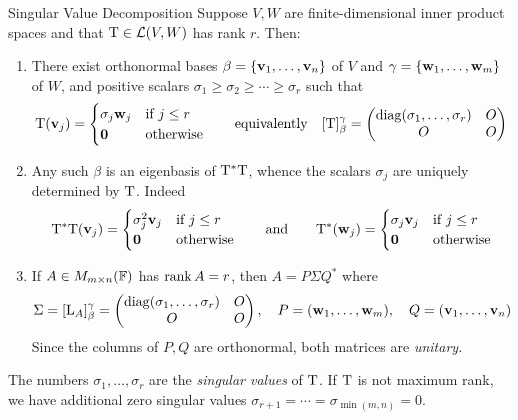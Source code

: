 \begin{thm}{Singular Value Decomposition}{}
	Suppose $V,W$ are finite-dimensional inner product spaces and that $\mathrm{T}\in\mathcal{L}(V,W)$ has rank $r$. Then:
	\begin{enumerate}
	  \item There exist orthonormal bases $\beta=\{{\mathbf{{\mathbf{v}}}}_1,\ldots,{\mathbf{{\mathbf{v}}}}_{n}\}$ of $V$ and $\gamma=\{{\mathbf{{\mathbf{w}}}}_1,\ldots,{\mathbf{{\mathbf{w}}}}_{m}\}$ of $W$, and positive scalars $\sigma_1\ge\sigma_2\ge\cdots\ge \sigma_r$ such that
		\[
			\mathrm{T}({\mathbf{v}}_j)=
			\begin{cases}
				\sigma_j{\mathbf{w}}_j&\text{if }j\le r\\
				\mathbf{0}&\text{otherwise}
			\end{cases}
			\qquad\text{equivalently}\quad 
			[\mathrm{T}]_\beta^\gamma=
			\begin{pmatrix}
				\operatorname{diag}(\sigma_1,\ldots,\sigma_r)&O\\
				O&O
			\end{pmatrix}
		\]
		\item Any such $\beta$ is an eigenbasis of $\mathrm{T}^*\mathrm{T}$, whence the scalars $\sigma_j$ are uniquely determined by $\mathrm{T}$. Indeed
	  \[
	  	\mathrm{T}^*\mathrm{T}({\mathbf{v}}_j)=
	  	\begin{cases}
	  		\sigma_j^2{\mathbf{v}}_j&\text{if }j\le r\\
	  		\mathbf{0}&\text{otherwise}
	  	\end{cases}
	  	\qquad\text{and}\qquad
	  	\mathrm{T}^*({\mathbf{w}}_j)=
	  	\begin{cases}
	  		\sigma_j{\mathbf{v}}_j&\text{if }j\le r\\
	  		\mathbf{0}&\text{otherwise}
	  	\end{cases}
	  \]
		\item If $A\in M_{m\times n}(\mathbb{F})$ has $\operatorname{rank} A=r$, then $A=P\Sigma Q^*$ where
	  \[
	  	\Sigma=[\mathrm{L}_A]_\beta^\gamma=
	  	\begin{pmatrix}
				\operatorname{diag}(\sigma_1,\ldots,\sigma_r)&O\\
				O&O
			\end{pmatrix}
			,\quad P=({\mathbf{{\mathbf{w}}}}_1,\ldots,{\mathbf{{\mathbf{w}}}}_{m}),\quad Q=({\mathbf{{\mathbf{v}}}}_1,\ldots,{\mathbf{{\mathbf{v}}}}_{n})
		\]
		Since the columns of $P,Q$ are orthonormal, both matrices are \emph{unitary.}
	\end{enumerate}
\end{thm}



\pagebreak[3]


\begin{defn}{}{}
	The numbers $\sigma_1,\ldots,\sigma_r$ are the \emph{singular values} of $\mathrm{T}$. If $\mathrm{T}$ is not maximum rank, we have additional zero singular values $\sigma_{r+1}=\cdots=\sigma_{\min(m,n)}=0$.
\end{defn}


